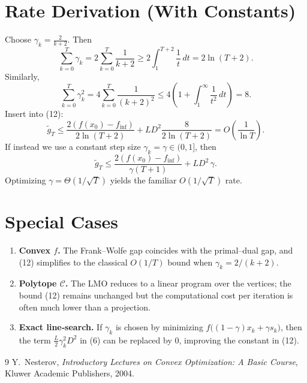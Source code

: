 \documentclass{article}
\begin{document}
\section*{Rate Derivation (With Constants)}
Choose $\gamma_k = \frac{2}{k+2}$.
Then
\[
\sum_{k=0}^{T}\gamma_k = 2\sum_{k=0}^{T}\frac{1}{k+2}
   \ge 2\int_{1}^{T+2}\frac{1}{t}\,dt = 2\ln(T+2) .
\]
Similarly,
\[
\sum_{k=0}^{T}\gamma_k^2 = 4\sum_{k=0}^{T}\frac{1}{(k+2)^2}
   \le 4\left(1+\int_{1}^{\infty}\frac{1}{t^2}\,dt\right)=8 .
\]
Insert into (12):
\[
\tilde g_T \le 
\frac{2(f(x_0)-f_{\inf})}{2\ln(T+2)} + L D^2\frac{8}{2\ln(T+2)}
          = O\!\left(\frac{1}{\ln T}\right).
\]
If instead we use a constant step size $\gamma_k=\gamma\in(0,1]$, then
\[
\tilde g_T \le \frac{2(f(x_0)-f_{\inf})}{\gamma (T+1)} 
          + L D^2\,\gamma .
\]
Optimizing $\gamma = \Theta(1/\sqrt{T})$ yields the familiar $O(1/\sqrt{T})$ rate.

\section*{Special Cases}
\begin{enumerate}
\item \textbf{Convex $f$.} The Frank–Wolfe gap coincides with the primal–dual gap, and (12) simplifies to the classical $O(1/T)$ bound when $\gamma_k=2/(k+2)$.
\item \textbf{Polytope $\mathcal C$.} The LMO reduces to a linear program over the vertices; the bound (12) remains unchanged but the computational cost per iteration is often much lower than a projection.
\item \textbf{Exact line‑search.} If $\gamma_k$ is chosen by minimizing $f\bigl((1-\gamma)x_k+\gamma s_k\bigr)$, then the term $\frac{L}{2}\gamma_k^2 D^2$ in (6) can be replaced by $0$, improving the constant in (12).
\end{enumerate}

\begin{thebibliography}{9}
Y.~Nesterov, \emph{Introductory Lectures on Convex Optimization: A Basic Course}, Kluwer Academic Publishers, 2004.
\end{thebibliography}
\end{document}
